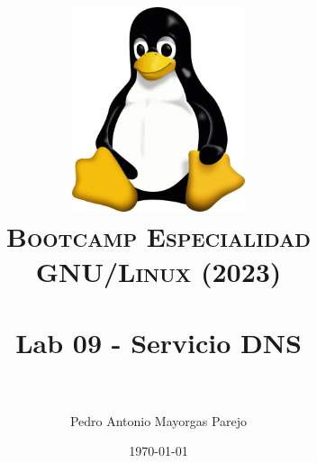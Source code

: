 

\graphicspath{ {img/} }

\title{
\normalfont \normalsize
\includegraphics[width=6cm,height=6cm]{logo}\\
\textsc{\textbf{Bootcamp Especialidad GNU/Linux (2023)}} \\ [25pt] %
\horrule{0.5pt} \\[0.4cm] %
\huge Lab 09 - Servicio DNS \\ %
\horrule{2pt} \\[0.5cm] %
}



\author{Pedro Antonio Mayorgas Parejo} %

\date{\normalsize\today} %




\maketitle %

\newpage %

\tableofcontents %

\newpage


